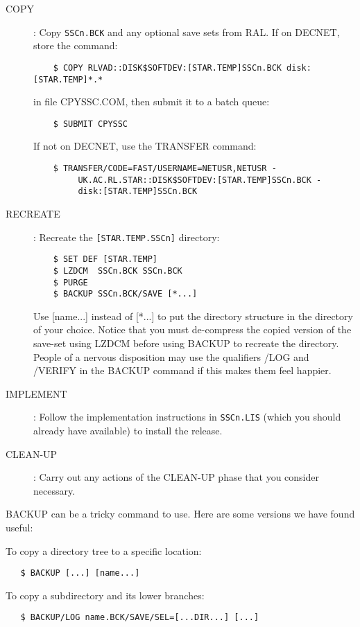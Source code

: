 \begin{description}

\item [COPY]: Copy {\tt SSCn.BCK} and any optional save sets from RAL.
If on DECNET, store the command:
\begin{verbatim}
    $ COPY RLVAD::DISK$SOFTDEV:[STAR.TEMP]SSCn.BCK disk:[STAR.TEMP]*.*
\end{verbatim}
in file CPYSSC.COM, then submit it to a batch queue:
\begin{verbatim}
    $ SUBMIT CPYSSC
\end{verbatim}
If not on DECNET, use the TRANSFER command:
\begin{verbatim}
    $ TRANSFER/CODE=FAST/USERNAME=NETUSR,NETUSR -
         UK.AC.RL.STAR::DISK$SOFTDEV:[STAR.TEMP]SSCn.BCK -
         disk:[STAR.TEMP]SSCn.BCK
\end{verbatim}

\item [RECREATE]: Recreate the {\tt [STAR.TEMP.SSCn]} directory:
\begin{verbatim}
    $ SET DEF [STAR.TEMP]
    $ LZDCM  SSCn.BCK SSCn.BCK
    $ PURGE
    $ BACKUP SSCn.BCK/SAVE [*...]
\end{verbatim}
Use [name...] instead of [*...] to put the directory structure in the directory
of your choice.
Notice that you must de-compress the copied version of the save-set using
LZDCM before using BACKUP to recreate the directory.
People of a nervous disposition may use the qualifiers /LOG and /VERIFY in the
BACKUP command if this makes them feel happier.

\item [IMPLEMENT]: Follow the implementation instructions in {\tt SSCn.LIS} 
(which you should already have available) to install the release.

\item [CLEAN-UP]: Carry out any actions of the CLEAN-UP phase that you consider
necessary.
\end{description}

BACKUP can be a tricky command to use.
Here are some versions we have found useful:

To copy a directory tree to a specific location:
\begin{verbatim}
   $ BACKUP [...] [name...]
\end{verbatim}
To copy a subdirectory and its lower branches:
\begin{verbatim}
   $ BACKUP/LOG name.BCK/SAVE/SEL=[...DIR...] [...]
\end{verbatim}

